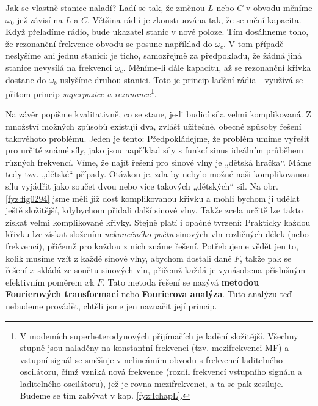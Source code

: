     Jak se vlastně stanice naladí? Ladí se tak, že změnou \(L\) nebo \(C\) v obvodu měníme 
    \(\omega_0\) jež závisí na \(L\) a \(C\). Většina rádií je zkonstruována tak, že se mění 
    kapacita. Když přeladíme rádio, bude ukazatel stanic v nové poloze. Tím dosáhneme toho, že 
    rezonanční frekvence obvodu se posune například do \(\omega_c\). V tom případě neslyšíme ani 
    jednu stanici: je ticho, samozřejmě za předpokladu, že žádná jiná stanice nevysílá na frekvenci 
    \(\omega_c\). Měníme-li dále kapacitu, až se rezonanční křivka dostane do \(\omega_b\) uslyšíme 
    druhou stanici. Toto je princip ladění rádia - využívá se přitom princip \emph{superpozice a 
    rezonance}\footnote{V modemích superheterodynových přijímačích je ladění složitější. Všechny 
    stupně jsou naladěny na konstantní frekvenci (tzv. mezifrekvenci MF) a vstupní signál se 
    směšuje v nelineámím obvodu s frekvencí laditelného oscilátoru, čímž vzniká nová frekvence 
    (rozdíl frekvencí vstupního signálu a laditelného oscilátoru), jež je rovna mezifrekvenci, a ta 
    se pak zesiluje. Budeme se tím zabývat v kap. \ref{fyz:IchapL}.}.
    
    Na závěr popišme kvalitativně, co se stane, je-li budicí síla velmi komplikovaná. Z množství 
    možných způsobů existují dva, zvlášť užitečné, obecné způsoby řešení takovéhoto problému. Jeden 
    je tento: Předpokládejme, že problém umíme vyřešit pro určité známé síly, jako jsou například 
    síly s funkcí sinus ideálním průběhem různých frekvencí. Víme, že najít řešení pro sinové vlny 
    je „dětská hračka“. Máme tedy tzv. „dětské“ případy. Otázkou je, zda by nebylo možné naši 
    komplikovanou sílu vyjádřit jako součet dvou nebo více takových „dětských“ sil. Na obr. 
    \ref{fyz:fig0294} jsme měli již dost komplikovanou křivku a mohli bychom ji udělat ještě 
    složitější, kdybychom přidali další sinové vlny. Takže zcela určitě lze takto získat velmi 
    komplikované křivky. Stejně platí i opačné tvrzení: Prakticky každou křivku lze získat složením 
    \emph{nekonečného počtu} sinových vln rozličných délek (nebo frekvencí), přičemž pro každou z 
    nich známe řešení. Potřebujeme vědět jen to, kolik musíme vzít z každé sinové vlny, abychom 
    dostali dané \(F\), takže pak se řešení \(x\) skládá ze součtu sinových vln, přičemž každá je 
    vynásobena příslušným efektivním poměrem \(x\)k  \(F\). Tato metoda řešení se nazývá 
    \textbf{metodou Fourierových transformací} nebo \textbf{Fourierova analýza}. Tuto analýzu teď 
    nebudeme provádět, chtěli jsme jen naznačit její princip.
    
